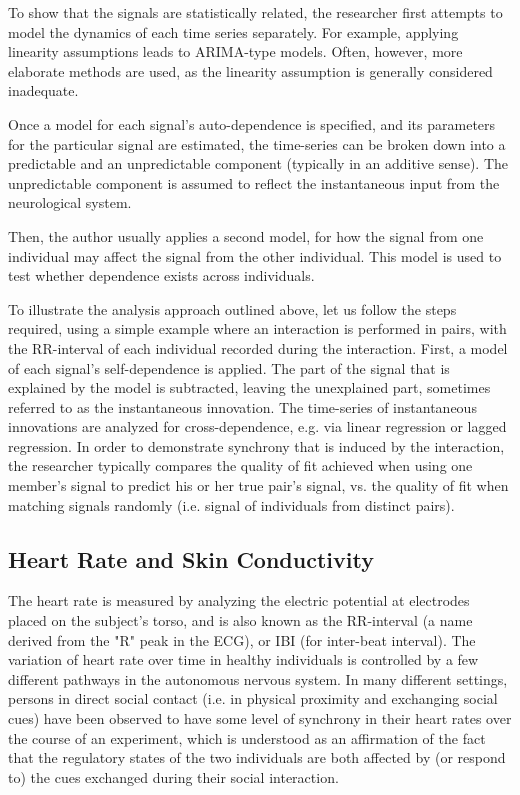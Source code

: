 \documentclass[a4paper, 11pt]{article}      %
\begin{document}
To show that the signals are statistically related, the researcher first attempts to model the dynamics of each time series separately. For example, applying linearity assumptions leads to ARIMA-type models. Often, however, more elaborate methods are used, as the linearity assumption is generally considered inadequate. 


Once a model for each signal's auto-dependence is specified, and its parameters for the particular signal are estimated, the time-series can be broken down into a predictable and an unpredictable component (typically in an additive sense). The unpredictable component is assumed to reflect the instantaneous input from the neurological system.

Then, the author usually applies a second model, for how the signal from one individual may affect the signal from the other individual. This model is used to test whether dependence exists across individuals. 

To illustrate the analysis approach outlined above, let us follow the steps required, using a simple example where an interaction is performed in pairs, with the RR-interval of each individual recorded during the interaction. First, a model of each signal's self-dependence is applied. The part of the signal that is explained by the model is subtracted, leaving the unexplained part, sometimes referred to as the instantaneous innovation. The time-series of instantaneous innovations are analyzed for cross-dependence, e.g. via linear regression or lagged regression. In order to demonstrate synchrony that is induced by the interaction, the researcher typically compares the quality of fit achieved when using one member's signal to predict his or her true pair's signal, vs. the quality of fit when matching signals randomly (i.e. signal of individuals from distinct pairs).



\subsection{Heart Rate and Skin Conductivity}
The heart rate is measured by analyzing the electric potential at electrodes placed on the subject's torso, and is also known as the RR-interval (a name derived from the "R" peak in the ECG), or IBI (for inter-beat interval). The variation of heart rate over time in healthy individuals is controlled by a few different pathways in the autonomous nervous system. In many different settings, persons in direct social contact (i.e. in physical proximity and exchanging social cues) have been observed to have some level of synchrony in their heart rates over the course of an experiment, which is understood as an affirmation of the fact that the regulatory states of the two individuals are both affected by (or respond to) the cues exchanged during their social interaction.
\end{document}
